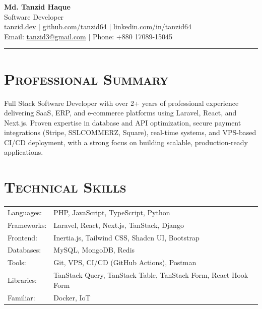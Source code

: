 \documentclass[11pt]{article}
\begin{document}
\raggedright

\begin{center}
	{\LARGE\bfseries Md. Tanzid Haque}\\[6pt]
	{\normalsize Software Developer}\\[6pt]
	\vspace{2pt}
	\href{https://tanzid.dev}{tanzid.dev} $\vert$ \href{https://github.com/tanzid64}{github.com/tanzid64} $\vert$ \href{https://linkedin.com/in/tanzid64}{linkedin.com/in/tanzid64}\\
	Email: \href{mailto:tanzid3@gmail.com}{tanzid3@gmail.com} $\vert$ Phone: +880 17089-15045
\end{center}

\vspace{6pt}
\hrule
\vspace{10pt}

\vspace{6pt}

\section*{\scshape Professional Summary}
Full Stack Software Developer with over 2+ years of professional experience delivering SaaS, ERP, and e-commerce platforms using Laravel, React, and Next.js. Proven expertise in database and API optimization, secure payment integrations (Stripe, SSLCOMMERZ, Square), real-time systems, and VPS-based CI/CD deployment, with a strong focus on building scalable, production-ready applications.

\section*{\scshape Technical Skills}
\begin{tabularx}{\textwidth}{@{}l X@{}}
Languages: & PHP, JavaScript, TypeScript, Python \\
Frameworks: & Laravel, React, Next.js, TanStack, Django \\
Frontend: & Inertia.js, Tailwind CSS, Shadcn UI, Bootstrap \\
Databases: & MySQL, MongoDB, Redis \\
Tools: & Git, VPS, CI/CD (GitHub Actions), Postman \\
Libraries: & TanStack Query, TanStack Table, TanStack Form, React Hook Form \\
Familiar: & Docker, IoT
\end{tabularx}
\end{document}
